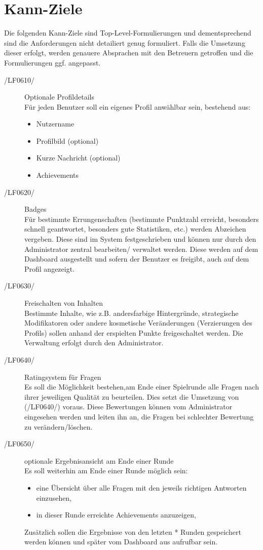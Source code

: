 \documentclass[11pt,a4paper]{scrreprt}
\begin{document}
	
\section{Kann-Ziele}
Die folgenden Kann-Ziele sind Top-Level-Formulierungen und dementsprechend sind die Anforderungen nicht detailiert genug formuliert. Falls die Umsetzung dieser erfolgt, werden genauere Absprachen mit den Betreuern getroffen und die Formulierungen ggf. angepasst.
\begin{description}
\item[/LF0610/] Optionale Profildetails \\ 
Für jeden Benutzer soll ein eigenes Profil anwählbar sein, bestehend aus:
	\begin{itemize}
	\item Nutzername
	\item Profilbild (optional)
	\item Kurze Nachricht (optional)
	\item Achievements
	\end{itemize}

\item[/LF0620/] Badges \\
Für bestimmte Errungenschaften (bestimmte Punktzahl erreicht, besonders schnell geantwortet, besonders gute Statistiken, etc.) werden Abzeichen vergeben. Diese sind im System festgeschrieben und können nur durch den Administrator zentral bearbeiten/ verwaltet werden. Diese werden auf dem Dashboard ausgestellt und sofern der Benutzer es freigibt, auch auf dem Profil angezeigt.
	
\item[/LF0630/] Freischalten von Inhalten \\
Bestimmte Inhalte, wie z.B. andersfarbige Hintergründe, strategische Modifikatoren oder andere kosmetische Veränderungen (Verzierungen des Profils) sollen anhand der erspielten Punkte freigeschaltet werden. Die Verwaltung erfolgt durch den Administrator.

\item[/LF0640/] Ratingsystem für Fragen \\
Es soll die Möglichkeit bestehen,am Ende einer Spielrunde alle Fragen nach ihrer jeweiligen Qualität zu beurteilen. Dies setzt die Umsetzung von (/LF0640/) voraus. Diese Bewertungen können vom Administrator eingesehen werden und leiten ihn an, die Fragen bei schlechter Bewertung zu verändern/löschen.

\item[/LF0650/] optionale Ergebnisansicht am Ende einer Runde \\
Es soll weiterhin am Ende einer Runde möglich sein:
		\begin{itemize}
		\item eine Übersicht über alle Fragen mit den jeweils richtigen Antworten einzusehen,
		\item in dieser Runde erreichte Achievements anzuzeigen,
		\end{itemize}
Zusätzlich sollen die Ergebnisse von den letzten * Runden gespeichert werden können und später vom Dashboard aus aufrufbar sein.


\end{description}
\end{document}
